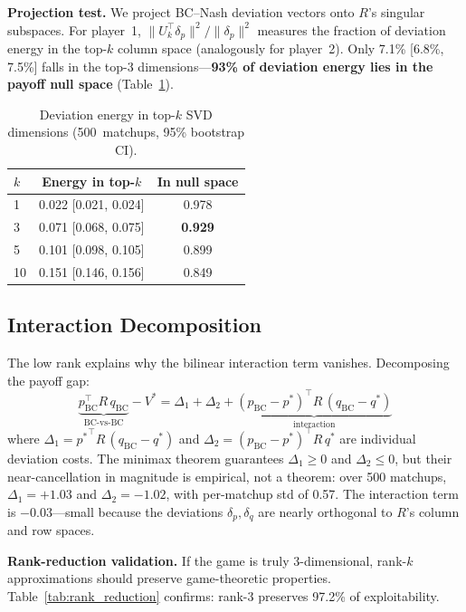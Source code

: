 \documentclass{article}
\begin{document}
\textbf{Projection test.} We project BC--Nash deviation vectors onto $R$'s singular subspaces. For player~1, $\|U_k^\top \delta_p\|^2 / \|\delta_p\|^2$ measures the fraction of deviation energy in the top-$k$ column space (analogously for player~2). Only 7.1\% [6.8\%, 7.5\%] falls in the top-3 dimensions---\textbf{93\% of deviation energy lies in the payoff null space} (Table~\ref{tab:projection}).

\begin{table}[t]
\caption{Deviation energy in top-$k$ SVD dimensions (500~matchups, 95\% bootstrap CI).}
\label{tab:projection}
\vskip 0.1in
\centering
\small
\begin{tabular}{lcc}
\toprule
$k$ & Energy in top-$k$ & In null space \\
\midrule
1 & 0.022 [0.021, 0.024] & 0.978 \\
3 & 0.071 [0.068, 0.075] & \textbf{0.929} \\
5 & 0.101 [0.098, 0.105] & 0.899 \\
10 & 0.151 [0.146, 0.156] & 0.849 \\
\bottomrule
\end{tabular}
\vskip -0.1in
\end{table}

\subsection{Interaction Decomposition}

The low rank explains why the bilinear interaction term vanishes. Decomposing the payoff gap:
\begin{equation}
\underbrace{p_\text{BC}^\top R\, q_\text{BC}}_{\text{BC-vs-BC}} - V^* = \Delta_1 + \Delta_2 + \underbrace{(p_\text{BC} - p^*)^\top R\, (q_\text{BC} - q^*)}_{\text{interaction}}
\label{eq:decomp}
\end{equation}
where $\Delta_1 = {p^*}^\top R\, (q_\text{BC} - q^*)$ and $\Delta_2 = (p_\text{BC} - p^*)^\top R\, q^*$ are individual deviation costs. The minimax theorem guarantees $\Delta_1 \geq 0$ and $\Delta_2 \leq 0$, but their near-cancellation in magnitude is empirical, not a theorem: over 500 matchups, $\Delta_1 = +1.03$ and $\Delta_2 = -1.02$, with per-matchup std of 0.57. The interaction term is $-0.03$---small because the deviations $\delta_p, \delta_q$ are nearly orthogonal to $R$'s column and row spaces.

\textbf{Rank-reduction validation.} If the game is truly 3-dimensional, rank-$k$ approximations should preserve game-theoretic properties. Table~\ref{tab:rank_reduction} confirms: rank-3 preserves 97.2\% of exploitability.
\end{document}
